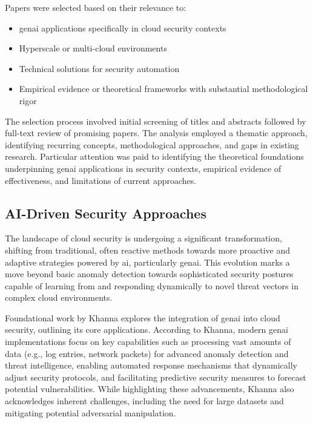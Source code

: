 Papers were selected based on their relevance to:

\begin{itemize}
\item \gls{genai} applications specifically in cloud security contexts
\item Hyperscale or multi-cloud environments
\item Technical solutions for security automation
\item Empirical evidence or theoretical frameworks with substantial methodological rigor
\end{itemize}

The selection process involved initial screening of titles and abstracts followed by full-text review of promising papers. The analysis employed a thematic approach, identifying recurring concepts, methodological approaches, and gaps in existing research. Particular attention was paid to identifying the theoretical foundations underpinning \gls{genai} applications in security contexts, empirical evidence of effectiveness, and limitations of current approaches.


\subsection{AI-Driven Security Approaches} %
\label{sec:AI-Driven Security Approaches}

The landscape of cloud security is undergoing a significant transformation, shifting from traditional, often reactive methods towards more proactive and adaptive strategies powered by \gls{ai}, particularly \gls{genai}. This evolution marks a move beyond basic anomaly detection towards sophisticated security postures capable of learning from and responding dynamically to novel threat vectors in complex cloud environments.

Foundational work by Khanna \cite{khanna_enhancing_2024} explores the integration of \gls{genai} into cloud security, outlining its core applications. According to Khanna, modern \gls{genai} implementations focus on key capabilities such as processing vast amounts of data (e.g., log entries, network packets) for advanced anomaly detection and threat intelligence, enabling automated response mechanisms that dynamically adjust security protocols, and facilitating predictive security measures to forecast potential vulnerabilities. While highlighting these advancements, Khanna also acknowledges inherent challenges, including the need for large datasets and mitigating potential adversarial manipulation.

